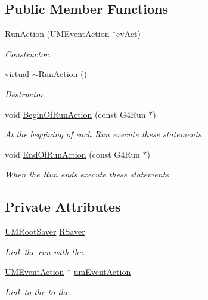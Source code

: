 \subsection*{Public Member Functions}
\begin{DoxyCompactItemize}
\item 
\hyperlink{classRunAction_aa78ccbe310c2ff7d480d4242c2751e64}{Run\+Action} (\hyperlink{classUMEventAction}{U\+M\+Event\+Action} $\ast$ev\+Act)
\begin{DoxyCompactList}\small\item\em Constructor. \end{DoxyCompactList}\item 
virtual \hyperlink{classRunAction_a58216a98ab75d4c0d6fd8b07e2d7d710}{$\sim$\+Run\+Action} ()
\begin{DoxyCompactList}\small\item\em Destructor. \end{DoxyCompactList}\item 
void \hyperlink{classRunAction_a14b3433a6875194c4adfe1c222884f0d}{Begin\+Of\+Run\+Action} (const G4\+Run $\ast$)
\begin{DoxyCompactList}\small\item\em At the beggining of each Run execute these statements. \end{DoxyCompactList}\item 
void \hyperlink{classRunAction_a49e3c5db63358317c3babca100163bd9}{End\+Of\+Run\+Action} (const G4\+Run $\ast$)
\begin{DoxyCompactList}\small\item\em When the Run ends execute these statements. \end{DoxyCompactList}\end{DoxyCompactItemize}
\subsection*{Private Attributes}
\begin{DoxyCompactItemize}
\item 
\hyperlink{classUMRootSaver}{U\+M\+Root\+Saver} \hyperlink{classRunAction_a6628a3f063d474237f3aa7167fff359e}{R\+Saver}
\begin{DoxyCompactList}\small\item\em Link the run with the. \end{DoxyCompactList}\item 
\hyperlink{classUMEventAction}{U\+M\+Event\+Action} $\ast$ \hyperlink{classRunAction_aa9cd1a37c94536b68ef616ea87dd48f7}{um\+Event\+Action}
\begin{DoxyCompactList}\small\item\em Link to the to the. \end{DoxyCompactList}\end{DoxyCompactItemize}



